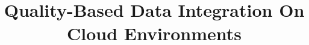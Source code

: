 \documentclass{vldb}
\begin{document}
 
 

\title{Quality-Based Data Integration On Cloud Environments}



%
%
% 
%

\end{document}
